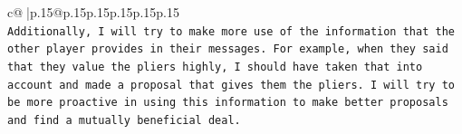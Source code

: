\documentclass{article}
\begin{document}
{\begin{supertabular}{c@{$\;$}|p{.15\linewidth}@{}p{.15\linewidth}p{.15\linewidth}p{.15\linewidth}p{.15\linewidth}p{.15\linewidth}}
{{{\\ 
\texttt{Additionally, I will try to make more use of the information that the other player provides in their messages. For example, when they said that they value the pliers highly, I should have taken that into account and made a proposal that gives them the pliers. I will try to be more proactive in using this information to make better proposals and find a mutually beneficial deal.} \\
            }
        }
    }
     \\ \\

\end{supertabular}
}
\end{document}
